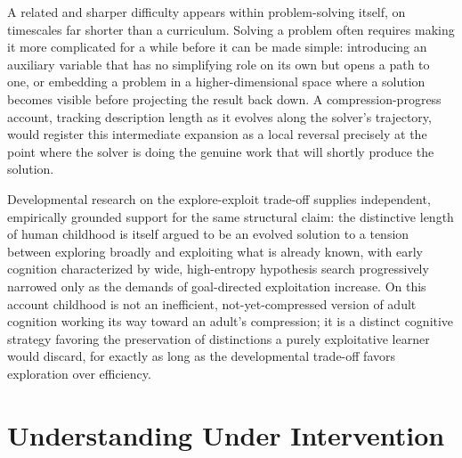 A related and sharper difficulty appears within problem-solving itself, on timescales far shorter than a curriculum. Solving a problem often requires making it more complicated for a while before it can be made simple: introducing an auxiliary variable that has no simplifying role on its own but opens a path to one, or embedding a problem in a higher-dimensional space where a solution becomes visible before projecting the result back down. A compression-progress account, tracking description length as it evolves along the solver's trajectory, would register this intermediate expansion as a local reversal precisely at the point where the solver is doing the genuine work that will shortly produce the solution.

Developmental research on the explore-exploit trade-off supplies independent, empirically grounded support for the same structural claim: the distinctive length of human childhood is itself argued to be an evolved solution to a tension between exploring broadly and exploiting what is already known, with early cognition characterized by wide, high-entropy hypothesis search progressively narrowed only as the demands of goal-directed exploitation increase. On this account childhood is not an inefficient, not-yet-compressed version of adult cognition working its way toward an adult's compression; it is a distinct cognitive strategy favoring the preservation of distinctions a purely exploitative learner would discard, for exactly as long as the developmental trade-off favors exploration over efficiency.

\section{Understanding Under Intervention}

